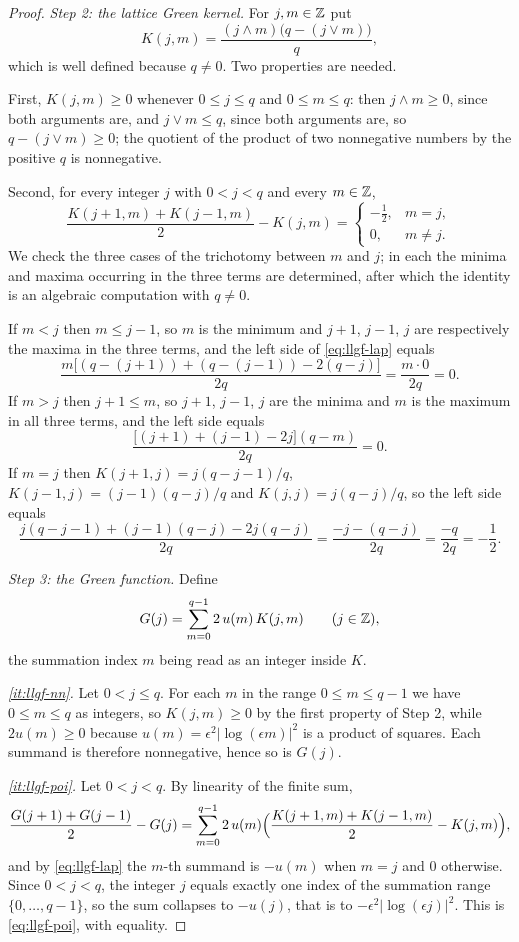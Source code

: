 \begin{proof}
\emph{Step 2: the lattice Green kernel.} For $j,m\in\mathbb{Z}$ put
\[
  K(j,m)=\frac{(j\wedge m)\bigl(q-(j\vee m)\bigr)}{q},
\]
which is well defined because $q\ne0$. Two properties are needed.

First, $K(j,m)\ge0$ whenever $0\le j\le q$ and $0\le m\le q$: then
$j\wedge m\ge0$, since both arguments are, and $j\vee m\le q$, since both
arguments are, so $q-(j\vee m)\ge0$; the quotient of the product of two
nonnegative numbers by the positive $q$ is nonnegative.

Second, for every integer $j$ with $0<j<q$ and every $m\in\mathbb{Z}$,
\begin{equation}\label{eq:llgf-lap}
  \frac{K(j+1,m)+K(j-1,m)}{2}-K(j,m)
  =\begin{cases}-\tfrac12,&m=j,\\[2pt]0,&m\ne j.\end{cases}
\end{equation}
We check the three cases of the trichotomy between $m$ and $j$; in each the
minima and maxima occurring in the three terms are determined, after which the
identity is an algebraic computation with $q\ne0$.

If $m<j$ then $m\le j-1$, so $m$ is the minimum and $j+1$, $j-1$, $j$ are
respectively the maxima in the three terms, and the left side of
\eqref{eq:llgf-lap} equals
\[
  \frac{m\bigl[(q-(j+1))+(q-(j-1))-2(q-j)\bigr]}{2q}=\frac{m\cdot0}{2q}=0 .
\]
If $m>j$ then $j+1\le m$, so $j+1$, $j-1$, $j$ are the minima and $m$ is the
maximum in all three terms, and the left side equals
\[
  \frac{\bigl[(j+1)+(j-1)-2j\bigr](q-m)}{2q}=0 .
\]
If $m=j$ then $K(j+1,j)=j(q-j-1)/q$, $K(j-1,j)=(j-1)(q-j)/q$ and
$K(j,j)=j(q-j)/q$, so the left side equals
\[
  \frac{j(q-j-1)+(j-1)(q-j)-2j(q-j)}{2q}
   =\frac{-j-(q-j)}{2q}=\frac{-q}{2q}=-\frac12 .
\]

\emph{Step 3: the Green function.} Define
\[
  G(j)=\sum_{m=0}^{q-1}2\,u(m)\,K(j,m)\qquad(j\in\mathbb{Z}),
\]
the summation index $m$ being read as an integer inside $K$.

\emph{\ref{it:llgf-nn}.} Let $0<j\le q$. For each $m$ in the range
$0\le m\le q-1$ we have $0\le m\le q$ as integers, so $K(j,m)\ge0$ by the first
property of Step 2, while $2u(m)\ge0$ because $u(m)=\epsilon^2|\log(\epsilon
m)|^2$ is a product of squares. Each summand is therefore nonnegative, hence so
is $G(j)$.

\emph{\ref{it:llgf-poi}.} Let $0<j<q$. By linearity of the finite sum,
\[
  \frac{G(j+1)+G(j-1)}{2}-G(j)
  =\sum_{m=0}^{q-1}2\,u(m)
     \Bigl(\frac{K(j+1,m)+K(j-1,m)}{2}-K(j,m)\Bigr),
\]
and by \eqref{eq:llgf-lap} the $m$-th summand is $-u(m)$ when $m=j$ and $0$
otherwise. Since $0<j<q$, the integer $j$ equals exactly one index of the
summation range $\{0,\ldots,q-1\}$, so the sum collapses to $-u(j)$, that is to
$-\epsilon^2|\log(\epsilon j)|^2$. This is \eqref{eq:llgf-poi}, with equality.


\end{proof}
